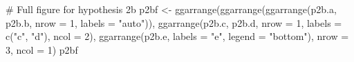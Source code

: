 \documentclass[
  bookmarksnumbered]{article}
\newenvironment{Shaded}{\begin{snugshade}}{\end{snugshade}}
\newcommand{\AttributeTok}[1]{\textcolor[rgb]{0.80,0.80,0.80}{#1}}
\newcommand{\CommentTok}[1]{\textcolor[rgb]{0.50,0.62,0.50}{#1}}
\newcommand{\DecValTok}[1]{\textcolor[rgb]{0.86,0.86,0.80}{#1}}
\newcommand{\FunctionTok}[1]{\textcolor[rgb]{0.94,0.94,0.56}{#1}}
\newcommand{\NormalTok}[1]{\textcolor[rgb]{0.80,0.80,0.80}{#1}}
\newcommand{\OtherTok}[1]{\textcolor[rgb]{0.94,0.94,0.56}{#1}}
\newcommand{\StringTok}[1]{\textcolor[rgb]{0.80,0.58,0.58}{#1}}
\begin{document}
\begin{Shaded}
\begin{Highlighting}[]
\CommentTok{\# Full figure for hypothesis 2b}
\NormalTok{p2bf }\OtherTok{\textless{}{-}} \FunctionTok{ggarrange}\NormalTok{(}\FunctionTok{ggarrange}\NormalTok{(}\FunctionTok{ggarrange}\NormalTok{(p2b.a, p2b.b,}
                                      \AttributeTok{nrow =} \DecValTok{1}\NormalTok{,}
                                      \AttributeTok{labels =} \StringTok{"auto"}\NormalTok{)), }
                  \FunctionTok{ggarrange}\NormalTok{(p2b.c, p2b.d,}
                            \AttributeTok{nrow =} \DecValTok{1}\NormalTok{,}
                            \AttributeTok{labels =} \FunctionTok{c}\NormalTok{(}\StringTok{"c"}\NormalTok{, }\StringTok{"d"}\NormalTok{),}
                            \AttributeTok{ncol =} \DecValTok{2}\NormalTok{),}
                  \FunctionTok{ggarrange}\NormalTok{(p2b.e,}
                            \AttributeTok{labels =} \StringTok{"e"}\NormalTok{,}
                            \AttributeTok{legend =} \StringTok{"bottom"}\NormalTok{),}
                  \AttributeTok{nrow =} \DecValTok{3}\NormalTok{,}
                  \AttributeTok{ncol =} \DecValTok{1}\NormalTok{)}
\NormalTok{p2bf}
\end{Highlighting}
\end{Shaded}
\end{document}
